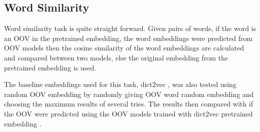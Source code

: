     \subsection{Word Similarity}
        Word similarity task is quite straight forward. Given pairs of
        words, if the word is an OOV in the pretrained embedding, the
        word embeddings were predicted from OOV models then the cosine
        similarity of the word embeddings are calculated and compared
        between two models, else the original embedding from the
        pretrained embedding is used. 
        
        The baseline embeddings used for this task, dict2vec
        \citep{dict2vect2017tissier}, was also tested using random OOV
        embedding by randomly giving OOV word random embedding and
        choosing the maximum results of several tries. The results
        then compared with if the OOV were predicted using the OOV
        models trained with dict2vec pretrained embedding
        \citep{dict2vect2017tissier}.